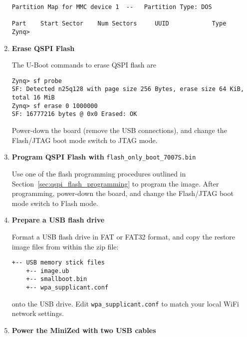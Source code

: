\begin{enumerate}
\begin{verbatim}
Partition Map for MMC device 1  --   Partition Type: DOS

Part    Start Sector    Num Sectors     UUID            Type
Zynq>
\end{verbatim}
%

\item \textbf{Erase QSPI Flash}

The U-Boot commands to erase QSPI flash are
%
\begin{verbatim}
Zynq> sf probe
SF: Detected n25q128 with page size 256 Bytes, erase size 64 KiB, total 16 MiB
Zynq> sf erase 0 1000000
SF: 16777216 bytes @ 0x0 Erased: OK
\end{verbatim}
%
Power-down the board (remove the USB connections), and change the Flash/JTAG
boot mode switch to JTAG mode.

\item \textbf{Program QSPI Flash with} \verb+flash_only_boot_7007S.bin+

Use one of the flash programming procedures outlined in
Section~\ref{sec:qspi_flash_programming} to program the image.
After programming, power-down the board, and change the Flash/JTAG boot
mode switch to Flash mode.

\item \textbf{Prepare a USB flash drive}

Format a USB flash drive in FAT or FAT32 format, and copy the restore image
files from within the zip file:
%
\begin{verbatim}
+-- USB memory stick files
    +-- image.ub
    +-- smallboot.bin
    +-- wpa_supplicant.conf
\end{verbatim}
%
onto the USB drive. Edit \verb+wpa_supplicant.conf+ to match your local
WiFi network settings.

\item \textbf{Power the MiniZed with two USB cables}


\end{enumerate}
